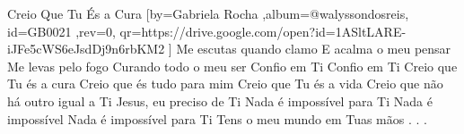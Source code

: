 \beginsong
{Creio Que Tu És a Cura %
}[by={Gabriela Rocha %
},album={@walyssondosreis},
id={GB0021 %
},rev={0}, %
qr={https://drive.google.com/open?id=1ASltLARE-iJFe5cWS6eJsdDj9n6rbKM2 %
}]
\beginverse*
Me escutas quando clamo
E acalma o meu pensar
Me levas pelo fogo
Curando todo o meu ser
Confio em Ti
Confio em Ti
\endverse
\beginchorus
Creio que Tu és a cura
Creio que és tudo para mim
Creio que Tu és a vida
Creio que não há outro igual a Ti
Jesus, eu preciso de Ti
\endchorus
\beginverse*
Nada é impossível para Ti
Nada é impossível
Nada é impossível para Ti
Tens o meu mundo em Tuas mãos
\endverse
\beginverse*\color{white}
.
.
.
\endverse

\begin{comment}
\lstset{basicstyle=\scriptsize\bf} %
\tab{Solo 1}
\begin{lstlisting}
E|-----------------------------------------------------|
B|-----------------------------------------------------|
G|-----------------------------------------------------|
D|-----------------------------------------------------|
A|-----------------------------------------------------|
E|-----------------------------------------------------|
\end{lstlisting}
\end{comment}
 
